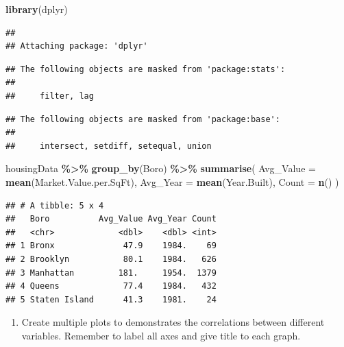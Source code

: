 \documentclass[
]{article}
\newenvironment{Shaded}{\begin{snugshade}}{\end{snugshade}}
\newcommand{\AttributeTok}[1]{\textcolor[rgb]{0.13,0.29,0.53}{#1}}
\newcommand{\FunctionTok}[1]{\textcolor[rgb]{0.13,0.29,0.53}{\textbf{#1}}}
\newcommand{\NormalTok}[1]{#1}
\newcommand{\SpecialCharTok}[1]{\textcolor[rgb]{0.81,0.36,0.00}{\textbf{#1}}}
\providecommand{\tightlist}{%
  \setlength{\itemsep}{0pt}\setlength{\parskip}{0pt}}
\begin{document}
\begin{Shaded}
\begin{Highlighting}[]
\FunctionTok{library}\NormalTok{(dplyr)}
\end{Highlighting}
\end{Shaded}

\begin{verbatim}
## 
## Attaching package: 'dplyr'
\end{verbatim}

\begin{verbatim}
## The following objects are masked from 'package:stats':
## 
##     filter, lag
\end{verbatim}

\begin{verbatim}
## The following objects are masked from 'package:base':
## 
##     intersect, setdiff, setequal, union
\end{verbatim}

\begin{Shaded}
\begin{Highlighting}[]
\NormalTok{housingData }\SpecialCharTok{\%\textgreater{}\%}
  \FunctionTok{group\_by}\NormalTok{(Boro) }\SpecialCharTok{\%\textgreater{}\%}
  \FunctionTok{summarise}\NormalTok{(}
    \AttributeTok{Avg\_Value =} \FunctionTok{mean}\NormalTok{(Market.Value.per.SqFt),}
    \AttributeTok{Avg\_Year =} \FunctionTok{mean}\NormalTok{(Year.Built),}
    \AttributeTok{Count =} \FunctionTok{n}\NormalTok{()}
\NormalTok{  )}
\end{Highlighting}
\end{Shaded}

\begin{verbatim}
## # A tibble: 5 x 4
##   Boro          Avg_Value Avg_Year Count
##   <chr>             <dbl>    <dbl> <int>
## 1 Bronx              47.9    1984.    69
## 2 Brooklyn           80.1    1984.   626
## 3 Manhattan         181.     1954.  1379
## 4 Queens             77.4    1984.   432
## 5 Staten Island      41.3    1981.    24
\end{verbatim}

\begin{enumerate}
\def\labelenumi{\alph{enumi}.}
\setcounter{enumi}{1}
\tightlist
\item
  Create multiple plots to demonstrates the correlations between
  different variables. Remember to label all axes and give title to each
  graph.
\end{enumerate}
\end{document}
